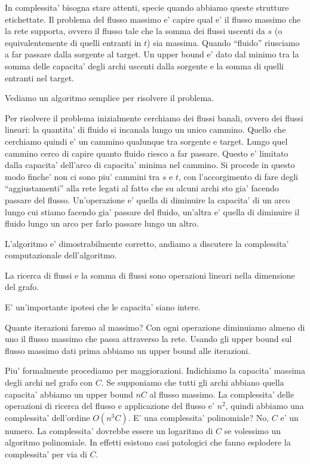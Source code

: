 In complessita' bisogna stare attenti, specie quando abbiamo queste strutture etichettate. Il
problema del flusso massimo e' capire qual e' il flusso massimo che la rete supporta, ovvero il
flusso tale che la somma dei flussi uscenti da $s$ (o equivalentemente di quelli entranti in $t$)
sia massima. Quando ``fluido'' riusciamo a far passare dalla sorgente al target. Un upper bound e'
dato dal minimo tra la somma delle capacita' degli archi uscenti dalla sorgente e la somma di quelli
entranti nel target.

Vediamo un algoritmo semplice per risolvere il problema.

Per risolvere il problema inizialmente cerchiamo dei flussi banali, ovvero dei flussi lineari: la
quantita' di fluido si incanala lungo un unico cammino. Quello che cerchiamo quindi e' un cammino
qualunque tra sorgente e target. Lungo quel cammino cerco di capire quanto fluido riesco a far
passare. Questo e' limitato dalla capacita' dell'arco di capacita' minima nel cammino. Si procede in
questo modo finche' non ci sono piu' cammini tra $s$ e $t$, con l'accorgimento di fare degli
``aggiustamenti'' alla rete legati al fatto che su alcuni archi sto gia' facendo passare del flusso.
Un'operazione e' quella di diminuire la capacita' di un arco lungo cui stiamo facendo gia' passare
del fluido, un'altra e' quella di diminuire il fluido lungo un arco per farlo passare lungo un
altro.

L'algoritmo e' dimostrabilmente corretto, andiamo a discutere la complessita' computazionale
dell'algoritmo.

La ricerca di flussi e la somma di flussi sono operazioni lineari nella dimensione del grafo.

E' un'importante ipotesi che le capacita' siano intere.

Quante iterazioni faremo al massimo? Con ogni operazione diminuiamo almeno di uno il flusso massimo
che passa attraverso la rete. Usando gli upper bound sul flusso massimo dati prima abbiamo un
upper bound alle iterazioni.

Piu' formalmente procediamo per maggiorazioni. Indichiamo la capacita' massima degli archi nel grafo
con $C$. Se supponiamo che tutti gli archi abbiano quella capacita' abbiamo un upper bound $nC$ al
flusso massimo. La complessita' delle operazioni di ricerca del flusso e applicazione del flusso e'
$n^{2}$, quindi abbiamo una complessita' dell'ordine $O(n^{3}C)$. E' una complessita' polinomiale?
No, $C$ e' un numero. La complessita' dovrebbe essere un logaritmo di $C$ se volessimo un algoritmo
polinomiale. In effetti esistono casi patologici che fanno esplodere la complessita' per via di $C$.

